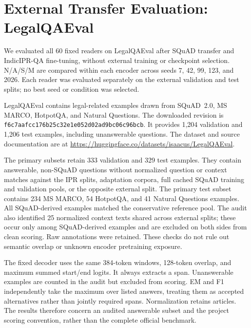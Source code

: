 \section{External Transfer Evaluation: LegalQAEval}
\label{sec:external_legalqaeval}

We evaluated all 60 fixed readers on LegalQAEval after SQuAD transfer
and IndicIPR-QA fine-tuning, without external training or checkpoint
selection. N/A/S/M are compared within each encoder across seeds 7, 42,
99, 123, and 2026. Each reader was evaluated separately on the external
validation and test splits; no best seed or condition was selected.

LegalQAEval contains legal-related examples drawn from SQuAD~2.0,
MS MARCO, HotpotQA, and Natural Questions. The downloaded revision is
\texttt{f6c7aafcc176b25c32e1e052d02ad9bc06c96bcb}.
It provides 1,204 validation and 1,206 test examples, including
unanswerable questions. The dataset and source documentation are at
\url{https://huggingface.co/datasets/isaacus/LegalQAEval}.

The primary subsets retain 333 validation and 329 test examples.
They contain answerable, non-SQuAD questions without normalized
question or context matches against the IPR splits, adaptation
corpora, full cached SQuAD training and validation pools, or the
opposite external split. The primary test subset contains 234
MS MARCO, 54 HotpotQA, and 41 Natural Questions examples. All
SQuAD-derived examples matched the conservative reference pool.
The audit also identified 25 normalized context texts shared across
external splits; these occur only among SQuAD-derived examples and
are excluded on both sides from clean scoring. Raw annotations
were retained. These checks do not rule out semantic overlap or
unknown encoder pretraining exposure.

The fixed decoder uses the same 384-token windows, 128-token overlap,
and maximum summed start/end logits. It always extracts a span.
Unanswerable examples are counted in the audit but excluded from
scoring. EM and F1 independently take the maximum over listed answers,
treating them as accepted alternatives rather than jointly required
spans. Normalization retains articles. The results therefore concern
an audited answerable subset and the project scoring convention,
rather than the complete official benchmark.

